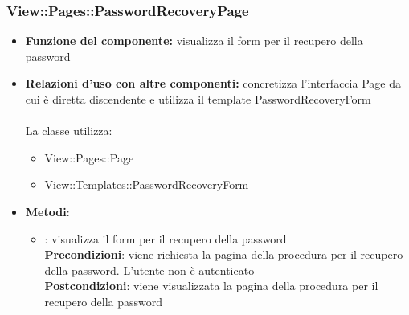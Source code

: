 \subsubsection{View::Pages::PasswordRecoveryPage}
\begin{itemize}
\item\textbf{Funzione del componente:} visualizza il form per il recupero della password
				\item\textbf{Relazioni d'uso con altre componenti:} concretizza l'interfaccia Page da cui è diretta discendente e utilizza il template PasswordRecoveryForm\\ \\
La classe utilizza:
	\begin{itemize}
		\item View::Pages::Page\\
		\item View::Templates::PasswordRecoveryForm\\
	\end{itemize}
\item\textbf{Metodi}:
	\begin{itemize}
		\item{}: visualizza il form per il recupero della password\\
		\textbf{Precondizioni}: viene richiesta la pagina della procedura per il recupero della password. L'utente non è autenticato\\
		\textbf{Postcondizioni}: viene visualizzata la pagina della procedura per il recupero della password\\
	\end{itemize}
\end{itemize}


